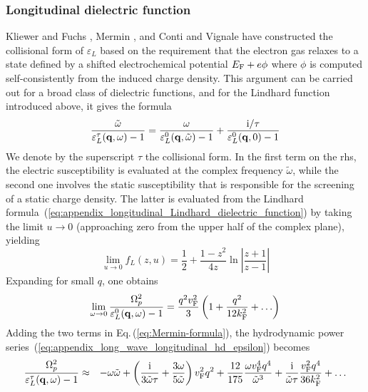 \documentclass[11pt, oneside]{article}   	%
\def\OmegaP{\Omega_{p}}
\begin{document}
\subsubsection{Longitudinal dielectric function}

Kliewer and Fuchs \citep{Kliewer_1969a}, Mermin \citep{Mermin_1970},
and Conti and Vignale \citep{Conti_1999}
have constructed
the collisional form of $\varepsilon_{L}$ based on the requirement that the
electron gas relaxes to a state defined by a shifted electrochemical potential
$E_{\rm F} + e \phi$ where $\phi$ is computed self-consistently from the induced
charge density. This argument can be carried out for a broad class of dielectric
functions, and for the Lindhard function introduced above, it gives the formula
\begin{equation}
\frac{ \tilde\omega }{ \varepsilon^{\tau}_{L}( {\bf q}, \omega ) - 1 }
= 
\frac{ \omega }{ \varepsilon^{0}_{L}( {\bf q}, \tilde\omega ) - 1 }
+
\frac{ {\rm i}/\tau }{ \varepsilon^{0}_{L}( {\bf q}, 0 ) - 1 }
\label{eq:Mermin-formula}
\end{equation}
We denote by the superscript $\tau$ the collisional form. In the first term on the rhs, 
the electric susceptibility is evaluated at the complex frequency $\tilde\omega$, 
while the second one involves
the static susceptibility that is responsible for the screening of a static charge
density. The latter is evaluated from the Lindhard formula~(\ref{eq:appendix_longitudinal_Lindhard_dielectric_function}) 
by taking the limit $u \to 0$
(approaching zero from the upper half of the complex plane), yielding
\begin{equation}
\lim\limits_{u \to 0} f_{L}(z, u) = \frac{1}{2} + \frac{1-z^2}{4z}\ln\left|\frac{z+1}{z-1}\right|
\label{eq:appendix_zero_u_f_longitudinal}
\end{equation}
Expanding for small $q$, one obtains
\begin{equation}
\lim\limits_{\omega \to 0} 
\frac{ \OmegaP^2 }{ \varepsilon^0_{L}({\bf q}, \omega) - 1 }
= 
\frac{q^2v^2_{\rm F}}{3} \left( 1 + \frac{q^2}{12 k_{\rm F}^2} + \ldots 
\right)
\label{eq:appendix_long_wave_static_longitudinal_Lindhard_diel_fctn}
\end{equation}
Adding the two terms in Eq.\,(\ref{eq:Mermin-formula}), the hydrodynamic power 
series~(\ref{eq:appendix_long_wave_longitudinal_hd_epsilon}) becomes
\begin{eqnarray}
\frac{ \OmegaP^2 }{ \varepsilon^{\tau}_{L}({\bf q}, \omega) - 1 }
& \approx &
- \omega \tilde\omega 
+ \left( \frac{ {\rm i} }{ 3 \tilde\omega\tau } + \frac{3 \omega }{5 \tilde \omega} 
\right)
v_{\rm F}^2 q^2 
+ \frac{12}{175} \frac{ \omega v_{\rm F}^4 q^4 }{\tilde\omega^3}
+ \frac{ {\rm i} }{ \tilde\omega \tau }
\frac{v_{\rm F}^2 q^4}{36 k_{\rm F}^2}
+ \ldots
\label{eq:inverse-longitudinal-susceptibility}
\end{eqnarray}
\end{document}
